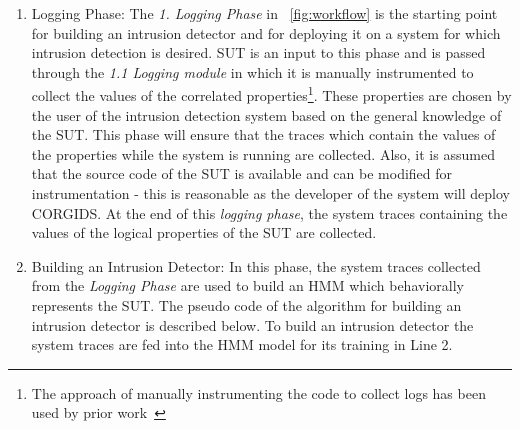 \begin{enumerate}
\item {Logging Phase}: The \textit{1. Logging Phase} in ~\autoref{fig:workflow} is the starting point for building an intrusion detector and for deploying it on a system for which intrusion detection is desired. \ac{SUT} is an input to this phase and is passed through the \textit{1.1 Logging module} in which it is manually instrumented to collect the values of the correlated properties\footnote{The approach of manually instrumenting the code to collect logs has been used by prior work~\cite{chen2018learning,aliabadi2017artinali}}. These properties are chosen by the user of the intrusion detection system based on the general knowledge of the \ac{SUT}. This phase will ensure that the traces which contain the values of the properties while the system is running are collected. Also, it is assumed that the source code of the \ac{SUT} is available and can be modified for instrumentation - this is reasonable as the developer of the system will deploy \ac{CORGIDS}. At the end of this \textit{logging phase}, the system traces containing the values of the logical properties of the \ac{SUT} are collected.

\item {Building an Intrusion Detector}: In this phase, the system traces collected from the \textit{Logging Phase} are used to build an \ac{HMM} which behaviorally represents the \ac{SUT}. The pseudo code of the algorithm for building an intrusion detector is described below. To build an intrusion detector the system traces are fed into the \ac{HMM} model for its training in Line 2.

\end{enumerate}
